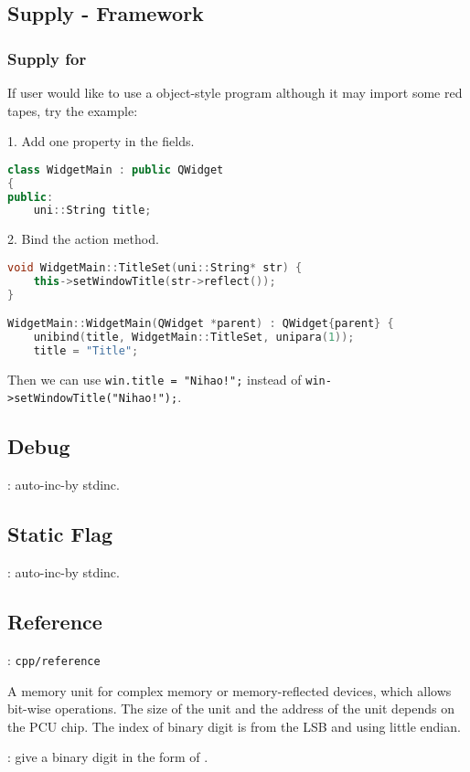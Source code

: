 \subsection{Supply \mbox{-} Framework}

\subsubsection{Supply for }

If user would like to use a object-style program although it may import some red tapes, try the example:

1. Add one property in the fields.
\begin{lstlisting}[language=C++]
class WidgetMain : public QWidget
{
public:
	uni::String title;
\end{lstlisting}

2. Bind the action method.
\begin{lstlisting}[language=C++]
void WidgetMain::TitleSet(uni::String* str) {
	this->setWindowTitle(str->reflect());
}

WidgetMain::WidgetMain(QWidget *parent) : QWidget{parent} {
	unibind(title, WidgetMain::TitleSet, unipara(1));
	title = "Title";
\end{lstlisting}

Then we can use \verb|win.title = "Nihao!";| instead of \verb|win->setWindowTitle("Nihao!");|.

\subsection{Debug}
: auto-inc-by stdinc.

\subsection{Static Flag}
: auto-inc-by stdinc.

\subsection{Reference}
: \verb`cpp/reference`

A memory unit for complex memory or memory-reflected devices, which allows bit-wise operations.
The size of {the unit} and {the address of the unit} depends on the PCU chip.
The index of binary digit is from the LSB and using little endian.

: give a binary digit in the form of . 

